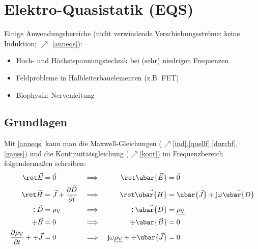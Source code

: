 	  \section{Elektro-Quasistatik (EQS)}\label{eqs}
	  Einige Anwendungsbereiche (nicht verwindende Verschiebungsströme; keine Induktion; $\nearrow$ \ref{anneqs}):
	  \begin{itemize}
	  	\item Hoch- und Höchstspannungstechnik bei (sehr) niedrigen Frequenzen
	  	\item Feldprobleme in Halbleiterbauelementen (z.B. FET)
	  	\item Biophysik; Nervenleitung
	  \end{itemize}
	    \subsection{Grundlagen}
		Mit \ref{anneqs} kann man die Maxwell-Gleichungen ($\nearrow$\ref{ind},\ref{quellf},\ref{durchf},\ref{gauss}) und die Kontinuitätsgleichung ($\nearrow$\ref{kont}) im Frequenzbereich folgendermaßen schreiben:
	  	\begin{align}
	  		\rot \vec{E}                                             & = \vec{0}           &\implies                            && \rot \ubar{\vec{E}}                                              & = \vec{0}    \label{ggeqs1}                                      \\
	  		\rot \vec{H}                                             & = \vec{J} + \frac{\partial \vec{D} }{\partial t}  &\implies && \rot \vec{\ubar{H}}                                              & = \ubar{\vec{J}} + \mathrm{j}\omega \vec{\ubar{D}} \label{ggeqs2}\\
	  		\div \vec{D}                                             & = \rho_\text{V}                                  &\implies  && \div \vec{\ubar{D}}                                              & = \underline{\rho_\text{V}}                        \\
	  		\div \vec{B}                                             & = 0                                              &\implies  && \div \ubar{\vec{B}}                                              & = 0                                                \\
	  		\frac{\partial \rho_\text{V}}{\partial t} + \div \vec{J} & =0                                               &\implies  && \mathrm{j}\omega \underline{\rho_\text{V}} + \div \ubar{\vec{J}} & =0
	  	\end{align}
